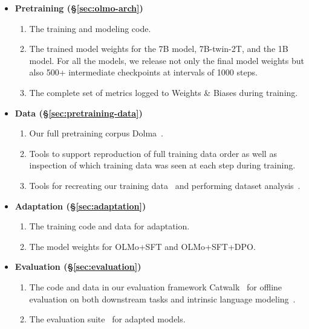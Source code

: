 \documentclass[11pt]{article}
\newcommand{\note}[4][]{\todo[author=#2,color=#3,fancyline,caption={}]{#4}} %
\newcommand{\kylel}[2][]{\note[#1]{\texttt{kylel}}{brown!40}{#2}}
\begin{document}
\begin{itemize}[noitemsep,leftmargin=4.5mm,beginpenalty=10000]
    \item \textbf{Pretraining (\S\ref{sec:olmo-arch})} 
    \begin{enumerate}
        \item The training and modeling code.
        \item The trained model weights for the 7B model, 7B-twin-2T, and the 1B model. For all the models, we release not only the final model weights but also 500+ intermediate checkpoints at intervals of 1000 steps.
        \item The complete set of metrics logged to Weights \& Biases during training.
    \end{enumerate}
    \item \textbf{Data (\S\ref{sec:pretraining-data})} 
    \begin{enumerate}
        \item Our full pretraining corpus Dolma~\citep{dolma}.
        \item Tools to support reproduction of full training data order as well as inspection of which training data was seen at each step during training.
        \item Tools for recreating our training data~\citep{dolma} and performing dataset analysis~\citep{wimbd}.
    \end{enumerate}
    \item \textbf{Adaptation (\S\ref{sec:adaptation})}
    \begin{enumerate}
        \item The training code and data for adaptation.
        \item The model weights for OLMo+SFT and OLMo+SFT+DPO.
    \end{enumerate}
    \item \textbf{Evaluation (\S\ref{sec:evaluation})}
    \begin{enumerate}
        \item The code and data in our evaluation framework Catwalk~\citep{groeneveld2023catwalk} for offline evaluation on both downstream tasks and intrinsic language modeling~\citep{magnusson2023paloma}.
        \item The evaluation suite~\citep{wang2023far,ivison2023camels} for adapted models.
    \end{enumerate}
\end{itemize}
\end{document}
